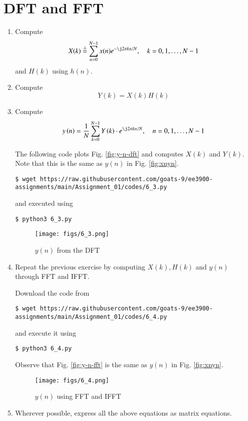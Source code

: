 \documentclass[journal,12pt,twocolumn]{IEEEtran}
\renewcommand\thesection{\arabic{section}}
\begin{document}
\section{DFT and FFT}
\begin{enumerate}[label=\thesection.\arabic*]
\item
Compute
\begin{equation}
X(k) \define \sum _{n=0}^{N-1}x(n) e^{-\j2\pi kn/N}, \quad k = 0,1,\dots, N-1
\end{equation}
and $H(k)$ using $h(n)$.
\item Compute 
\begin{equation}
Y(k) = X(k)H(k)
\label{eq:fp}
\end{equation}
\item Compute
\begin{equation}
y\brak{n}={\frac {1}{N}}\sum _{k=0}^{N-1}Y\brak{k}\cdot e^{\j 2\pi kn/N},\quad n = 0,1,\dots, N-1
\label{eq:inv-ft}
\end{equation}

\solution The following code plots Fig. \eqref{fig:y-n-dft} and computes $X(k)$
and $Y(k)$. Note that this is the same as $y(n)$ in Fig. \eqref{fig:xnyn}.

\begin{lstlisting}
$ wget https://raw.githubusercontent.com/goats-9/ee3900-assignments/main/Assignment_01/codes/6_3.py
\end{lstlisting}
and executed using
\begin{lstlisting}
$ python3 6_3.py
\end{lstlisting}

\begin{figure}[!ht]
	\centering
	\texttt{[image: figs/6\_3.png]}
	\caption{$y(n)$ from the DFT}
	\label{fig:y-n-dft}
\end{figure}
\item Repeat the previous exercise by computing $X(k), H(k)$ and $y(n)$ through FFT and 
IFFT.

\solution Download the code from
\begin{lstlisting}
$ wget https://raw.githubusercontent.com/goats-9/ee3900-assignments/main/Assignment_01/codes/6_4.py
\end{lstlisting}
and execute it using
\begin{lstlisting}
$ python3 6_4.py
\end{lstlisting}
Observe that Fig. \eqref{fig:y-n-fft} is the same as $y(n)$ in Fig. \eqref{fig:xnyn}.

\begin{figure}
	\centering
	\texttt{[image: figs/6\_4.png]}
	\caption{$y(n)$ using FFT and IFFT}
	\label{fig:y-n-fft}
\end{figure}
\item Wherever possible, express all the above equations as matrix equations.


\end{enumerate}
\end{document}
